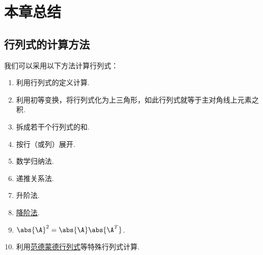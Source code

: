 \section{本章总结}
\subsection*{行列式的计算方法}
我们可以采用以下方法计算行列式：
\begin{enumerate}
	\item 利用行列式的定义计算.
	\item 利用初等变换，将行列式化为上三角形，如此行列式就等于主对角线上元素之积.
	\item 拆成若干个行列式的和.
	\item 按行（或列）展开.
	\item 数学归纳法.
	\item 递推关系法.
	\item 升阶法.
	\item \hyperref[theorem:逆矩阵.行列式降阶定理]{降阶法}.
	\item \(\abs{\A}^2 = \abs{\A} \abs{\A^T}\).
	\item 利用\hyperref[equation:行列式.范德蒙德行列式]{范德蒙德行列式}等特殊行列式计算.
\end{enumerate}

